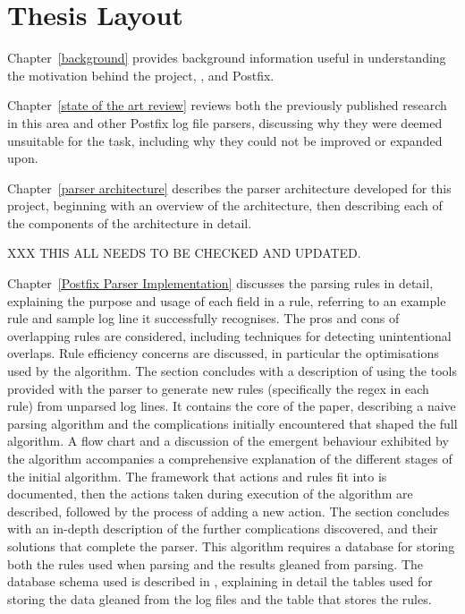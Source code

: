 \section{Thesis Layout}

Chapter~\ref{background} provides background information useful in
understanding the motivation behind the project, , and
Postfix.

Chapter~\ref{state of the art review} reviews both the previously published
research in this area and other Postfix log file parsers, discussing why
they were deemed unsuitable for the task, including why they could not be
improved or expanded upon.

Chapter~\ref{parser architecture} describes the parser architecture
developed for this project, beginning with an overview of the architecture,
then describing each of the components of the architecture in detail.

XXX THIS ALL NEEDS TO BE CHECKED AND UPDATED\@.

Chapter~\ref{Postfix Parser Implementation} discusses the parsing rules in
detail, explaining the purpose and usage of each field in a rule, referring
to an example rule and sample log line it successfully recognises.  The
pros and cons of overlapping rules are considered, including techniques for
detecting unintentional overlaps.  Rule efficiency concerns are discussed,
in particular the optimisations used by the algorithm.  The section
concludes with a description of using the tools provided with the parser to
generate new rules (specifically the regex in each rule) from unparsed log
lines.  It contains the core of the paper, describing a naive parsing
algorithm and the complications initially encountered that shaped the full
algorithm.  A flow chart and a discussion of the emergent behaviour
exhibited by the algorithm accompanies a comprehensive explanation of the
different stages of the initial algorithm.  The framework that actions and
rules fit into is documented, then the actions taken during execution of
the algorithm are described, followed by the process of adding a new
action.  The section concludes with an in-depth description of the further
complications discovered, and their solutions that complete the parser.
This algorithm requires a database for storing both the rules used when
parsing and the results gleaned from parsing.  The database schema used is
described in , explaining in detail the tables used
for storing the data gleaned from the log files and the table that stores
the rules.

